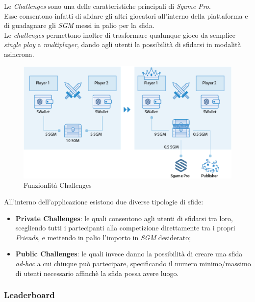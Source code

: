 \documentclass[11pt]{thesistemp}
\begin{document}
Le \textit{Challenges} sono una delle caratteristiche principali di \textit{Sgame Pro}.\\
Esse consentono infatti di sfidare gli altri giocatori all'interno della piattaforma e di guadagnare gli \textit{SGM} messi in palio per la sfida.\\
Le \textit{challenges} permettono inoltre di trasformare qualunque gioco da semplice \textit{single play} a \textit{multiplayer}, dando agli utenti la possibilità di sfidarsi in modalità asincrona.\\

\begin{figure}[h]\hfill
    \centering
    \includegraphics[width=\textwidth]{challenges.png}
        \caption{Funzionlità Challenges}
    \label{fig:challenges}
\end{figure}
All'interno dell'applicazione esistono due diverse tipologie di sfide:
\begin{itemize}
	\item \textbf{Private Challenges}: le quali consentono agli utenti di sfidarsi tra loro, scegliendo tutti i partecipanti alla competizione direttamente tra i propri \textit{Friends}, e mettendo in palio l'importo in \textit{SGM} desiderato;
	\item \textbf{Public Challenges}: le quali invece danno la possibilità di creare una sfida \textit{ad-hoc} a cui chiuque può partecipare, specificando il numero minimo/massimo di utenti necessario affinchè la sfida possa avere luogo.
\end{itemize}
\pagebreak

\subsubsection{Leaderboard}
\end{document}
